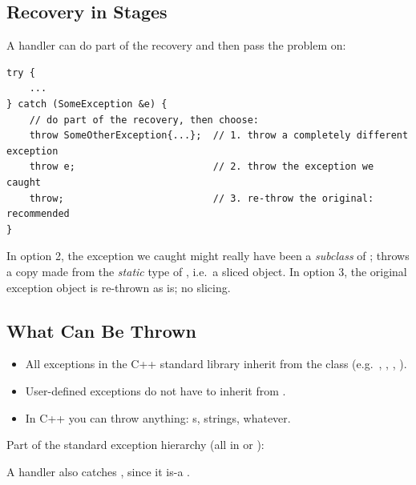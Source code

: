 \subsection{Recovery in Stages}
A handler can do part of the recovery and then pass the problem on:
\begin{lstlisting}[style=cpp]
try {
    ...
} catch (SomeException &e) {
    // do part of the recovery, then choose:
    throw SomeOtherException{...};  // 1. throw a completely different exception
    throw e;                        // 2. throw the exception we caught
    throw;                          // 3. re-throw the original: recommended
}
\end{lstlisting}
In option 2, the exception we caught might really have been a \emph{subclass}
of ;  throws a copy made from the
\emph{static} type of , i.e.\ a sliced object. In option 3, the original
exception object is re-thrown as is; no slicing.

\subsection{What Can Be Thrown}
\begin{itemize}
  \item All exceptions in the C++ standard library inherit from the class
         (e.g.\ ,
        , , ).
  \item User-defined exceptions do not have to inherit from .
  \item In C++ you can throw anything: s, strings, whatever.
\end{itemize}

Part of the standard exception hierarchy (all in  or ):
\begin{center}
\end{center}
A handler  also catches , since it is-a
.

